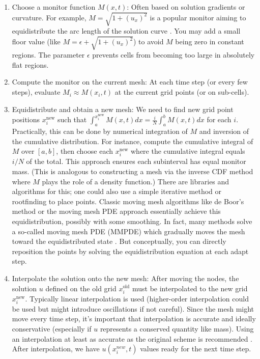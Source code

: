 \documentclass{adonis}
\begin{document}
\begin{enumerate}
    \item Choose a monitor function $M(x,t)$: Often based on solution gradients or curvature. For example, $M = \sqrt{1 + (u_x)^2}$ is a popular monitor aiming to equidistribute the arc length of the solution curve . You may add a small floor value (like $M = \epsilon + \sqrt{1+(u_x)^2}$) to avoid $M$ being zero in constant regions. The parameter $\epsilon$ prevents cells from becoming too large in absolutely flat regions.
    \item Compute the monitor on the current mesh: At each time step (or every few steps), evaluate $M_i \approx M(x_i,t)$ at the current grid points (or on sub-cells). 
    \item Equidistribute and obtain a new mesh: We need to find new grid point positions ${x_i^{\text{new}}}$ such that $\int_{a}^{x_i^{\text{new}}} M(x,t)dx = \frac{i}{N}\int_{a}^{b} M(x,t)dx$ for each $i$. Practically, this can be done by numerical integration of $M$ and inversion of the cumulative distribution. For instance, compute the cumulative integral of $M$ over $[a,b]$, then choose each $x_i^{\text{new}}$ where the cumulative integral equals $i/N$ of the total. This approach ensures each subinterval has equal monitor mass. (This is analogous to constructing a mesh via the inverse CDF method where $M$ plays the role of a density function.) There are libraries and algorithms for this; one could also use a simple iterative method or rootfinding to place points. Classic moving mesh algorithms like de Boor's method or the moving mesh PDE approach essentially achieve this equidistribution, possibly with some smoothing. In fact, many methods solve a so-called moving mesh PDE (MMPDE) which gradually moves the mesh toward the equidistributed state . But conceptually, you can directly reposition the points by solving the equidistribution equation at each adapt step.
    \item Interpolate the solution onto the new mesh: After moving the nodes, the solution $u$ defined on the old grid ${x_i^{\text{old}}}$ must be interpolated to the new grid ${x_i^{\text{new}}}$. Typically linear interpolation is used (higher-order interpolation could be used but might introduce oscillations if not careful). Since the mesh might move every time step, it’s important that interpolation is accurate and ideally conservative (especially if $u$ represents a conserved quantity like mass). Using an interpolation at least as accurate as the original scheme is recommended . After interpolation, we have $u(x_i^{new}, t)$ values ready for the next time step.

\end{enumerate}
\end{document}
